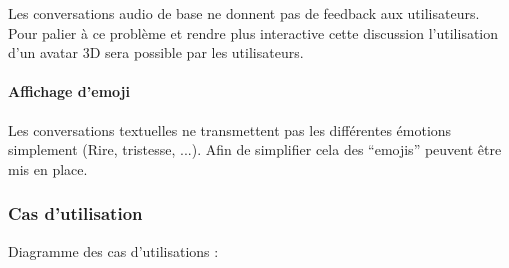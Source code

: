 \par Les conversations audio de base ne donnent pas de feedback aux utilisateurs. Pour palier à ce problème et rendre plus interactive cette discussion l’utilisation d’un avatar 3D sera possible par les utilisateurs.

\paragraph{Affichage d’emoji\newline}

\par Les conversations textuelles ne transmettent pas les différentes émotions simplement (Rire, tristesse, ...). Afin de simplifier cela des “emojis” peuvent être mis en place. 

\newpage
\subsubsection{Cas d’utilisation}

Diagramme des cas d'utilisations : \newline


